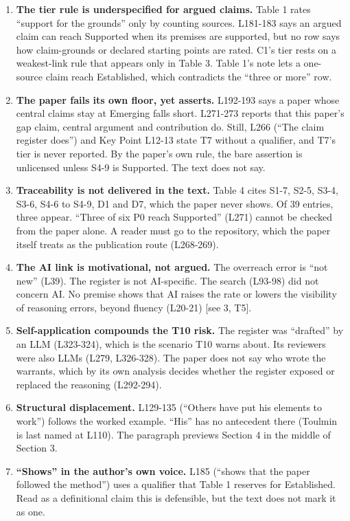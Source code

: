 {\begin{enumerate}
  shift.
\item
  \textbf{The tier rule is underspecified for argued claims.} Table 1
  rates ``support for the grounds'' only by counting sources. L181-183
  says an argued claim can reach Supported when its premises are
  supported, but no row says how claim-grounds or declared starting
  points are rated. C1's tier rests on a weakest-link rule that appears
  only in Table 3. Table 1's note lets a one-source claim reach
  Established, which contradicts the ``three or more'' row.
\item
  \textbf{The paper fails its own floor, yet asserts.} L192-193 says a
  paper whose central claims stay at Emerging falls short. L271-273
  reports that this paper's gap claim, central argument and contribution
  do. Still, L266 (``The claim register does'') and Key Point L12-13
  state T7 without a qualifier, and T7's tier is never reported. By the
  paper's own rule, the bare assertion is unlicensed unless S4-9 is
  Supported. The text does not say.
\item
  \textbf{Traceability is not delivered in the text.} Table 4 cites
  S1-7, S2-5, S3-4, S3-6, S4-6 to S4-9, D1 and D7, which the paper never
  shows. Of 39 entries, three appear. ``Three of six P0 reach
  Supported'' (L271) cannot be checked from the paper alone. A reader
  must go to the repository, which the paper itself treats as the
  publication route (L268-269).
\item
  \textbf{The AI link is motivational, not argued.} The overreach error
  is ``not new'' (L39). The register is not AI-specific. The search
  (L93-98) did not concern AI. No premise shows that AI raises the rate
  or lowers the visibility of reasoning errors, beyond fluency (L20-21)
  {[}see 3, T5{]}.
\item
  \textbf{Self-application compounds the T10 risk.} The register was
  ``drafted'' by an LLM (L323-324), which is the scenario T10 warns
  about. Its reviewers were also LLMs (L279, L326-328). The paper does
  not say who wrote the warrants, which by its own analysis decides
  whether the register exposed or replaced the reasoning (L292-294).
\item
  \textbf{Structural displacement.} L129-135 (``Others have put his
  elements to work'') follows the worked example. ``His'' has no
  antecedent there (Toulmin is last named at L110). The paragraph
  previews Section 4 in the middle of Section 3.
\item
  \textbf{``Shows'' in the author's own voice.} L185 (``shows that the
  paper followed the method'') uses a qualifier that Table 1 reserves
  for Established. Read as a definitional claim this is defensible, but
  the text does not mark it as one.
\end{enumerate}

}
